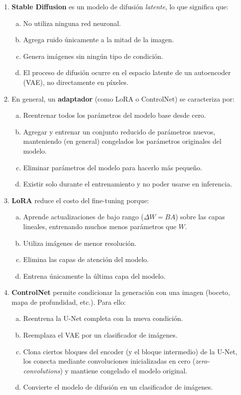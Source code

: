 \documentclass{article}
\begin{document}
\begin{enumerate}[{\bf 1.}]
	\item \textbf{Stable Diffusion} es un modelo de difusión \textit{latente}, lo que significa que:
	      \begin{enumerate}[(a)]
		      \item No utiliza ninguna red neuronal.
		      \item Agrega ruido únicamente a la mitad de la imagen.
		      \item Genera imágenes sin ningún tipo de condición.
		      \item El proceso de difusión ocurre en el espacio latente de un autoencoder (VAE), no directamente en píxeles.
	      \end{enumerate}

	\item En general, un \textbf{adaptador} (como LoRA o ControlNet) se caracteriza por:
	      \begin{enumerate}[(a)]
		      \item Reentrenar todos los parámetros del modelo base desde cero.
		      \item Agregar y entrenar un conjunto reducido de parámetros nuevos, manteniendo (en general) congelados los parámetros originales del modelo.
		      \item Eliminar parámetros del modelo para hacerlo más pequeño.
		      \item Existir solo durante el entrenamiento y no poder usarse en inferencia.
	      \end{enumerate}

	\item \textbf{LoRA} reduce el costo del fine-tuning porque:
	      \begin{enumerate}[(a)]
		      \item Aprende actualizaciones de bajo rango ($\Delta W = BA$) sobre las capas lineales, entrenando muchos menos parámetros que $W$.
		      \item Utiliza imágenes de menor resolución.
		      \item Elimina las capas de atención del modelo.
		      \item Entrena únicamente la última capa del modelo.
	      \end{enumerate}

	\item \textbf{ControlNet} permite condicionar la generación con una imagen (boceto, mapa de profundidad, etc.). Para ello:
	      \begin{enumerate}[(a)]
		      \item Reentrena la U-Net completa con la nueva condición.
		      \item Reemplaza el VAE por un clasificador de imágenes.
		      \item Clona ciertos bloques del encoder (y el bloque intermedio) de la U-Net, los conecta mediante convoluciones inicializadas en cero (\textit{zero-convolutions}) y mantiene congelado el modelo original.
		      \item Convierte el modelo de difusión en un clasificador de imágenes.
	      \end{enumerate}


\end{enumerate}
\end{document}
